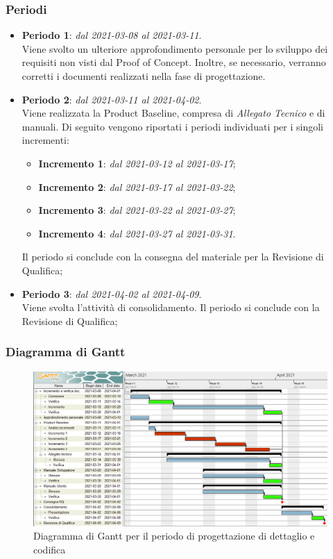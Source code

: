 \subsubsection{Periodi}

\begin{itemize}
\item \textbf{Periodo 1}: \textit{dal 2021-03-08 al 2021-03-11}. \\
Viene svolto un ulteriore approfondimento personale per lo sviluppo dei requisiti non visti dal Proof of Concept. Inoltre, se necessario, verranno corretti i documenti realizzati nella fase di progettazione.
\item \textbf{Periodo 2}: \textit{dal 2021-03-11 al 2021-04-02}. \\
Viene realizzata la Product Baseline, compresa di \textit{Allegato Tecnico} e di manuali. Di seguito vengono riportati i periodi individuati per i singoli incrementi:
\begin{itemize}
\item \textbf{Incremento 1}: \textit{dal 2021-03-12 al 2021-03-17};
\item \textbf{Incremento 2}: \textit{dal 2021-03-17 al 2021-03-22};
\item \textbf{Incremento 3}: \textit{dal 2021-03-22 al 2021-03-27};
\item \textbf{Incremento 4}: \textit{dal 2021-03-27 al 2021-03-31}.
\end{itemize}
Il periodo si conclude con la consegna del materiale per la Revisione di Qualifica;
\item \textbf{Periodo 3}: \textit{dal 2021-04-02 al 2021-04-09}. \\
Viene svolta l'attività di consolidamento. Il periodo si conclude con la Revisione di Qualifica;
\end{itemize}

\subsubsection{Diagramma di Gantt}

\begin{figure}[H]
\centering

\centerline{\includegraphics[scale=0.6]{res/Pianificazione/Gantt/codifica}}
\caption{Diagramma di Gantt per il periodo di progettazione di dettaglio e codifica}
\end{figure}

